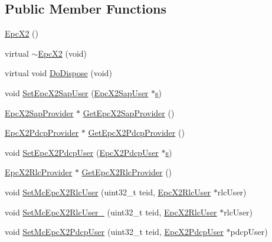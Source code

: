 \subsection*{Public Member Functions}
\begin{DoxyCompactItemize}
\item 
\hyperlink{classns3_1_1EpcX2_abb1f73b452bf9552772b910e0aa5cdd5}{Epc\+X2} ()
\item 
virtual \hyperlink{classns3_1_1EpcX2_a3b818e925c4a5894a011d53af38bdde5}{$\sim$\+Epc\+X2} (void)
\item 
virtual void \hyperlink{classns3_1_1EpcX2_accf3543ad5e0150d238edd6bbf626435}{Do\+Dispose} (void)
\item 
void \hyperlink{classns3_1_1EpcX2_ae91f9247984c4e0f55f5712cb062074e}{Set\+Epc\+X2\+Sap\+User} (\hyperlink{classns3_1_1EpcX2SapUser}{Epc\+X2\+Sap\+User} $\ast$\hyperlink{generate__test__data__lte__sinr_8m_ad83eeb3a142285d1243a08c6b7026df8}{s})
\item 
\hyperlink{classns3_1_1EpcX2SapProvider}{Epc\+X2\+Sap\+Provider} $\ast$ \hyperlink{classns3_1_1EpcX2_a8e0c457eda78448e403f6769be8e25c9}{Get\+Epc\+X2\+Sap\+Provider} ()
\item 
\hyperlink{classns3_1_1EpcX2PdcpProvider}{Epc\+X2\+Pdcp\+Provider} $\ast$ \hyperlink{classns3_1_1EpcX2_a22c4df71e275c74e0d27fc01b5a72366}{Get\+Epc\+X2\+Pdcp\+Provider} ()
\item 
void \hyperlink{classns3_1_1EpcX2_ae17788af334e346dc55c027034e46843}{Set\+Epc\+X2\+Pdcp\+User} (\hyperlink{classns3_1_1EpcX2PdcpUser}{Epc\+X2\+Pdcp\+User} $\ast$\hyperlink{generate__test__data__lte__sinr_8m_ad83eeb3a142285d1243a08c6b7026df8}{s})
\item 
\hyperlink{classns3_1_1EpcX2RlcProvider}{Epc\+X2\+Rlc\+Provider} $\ast$ \hyperlink{classns3_1_1EpcX2_a5b8041e9ebefadbacbe216665bea7b90}{Get\+Epc\+X2\+Rlc\+Provider} ()
\item 
void \hyperlink{classns3_1_1EpcX2_aa0b669dc4ab9143970d80d4cdbcd076f}{Set\+Mc\+Epc\+X2\+Rlc\+User} (uint32\+\_\+t teid, \hyperlink{classns3_1_1EpcX2RlcUser}{Epc\+X2\+Rlc\+User} $\ast$rlc\+User)
\item 
void \hyperlink{classns3_1_1EpcX2_aa3a4bab218092ffdb478bf65066e2c33}{Set\+Mc\+Epc\+X2\+Rlc\+User\+\_} (uint32\+\_\+t teid, \hyperlink{classns3_1_1EpcX2RlcUser}{Epc\+X2\+Rlc\+User} $\ast$rlc\+User)
\item 
void \hyperlink{classns3_1_1EpcX2_a9b7b0b62fb4a37e4551e159d9757a87a}{Set\+Mc\+Epc\+X2\+Pdcp\+User} (uint32\+\_\+t teid, \hyperlink{classns3_1_1EpcX2PdcpUser}{Epc\+X2\+Pdcp\+User} $\ast$pdcp\+User)

\end{DoxyCompactItemize}

